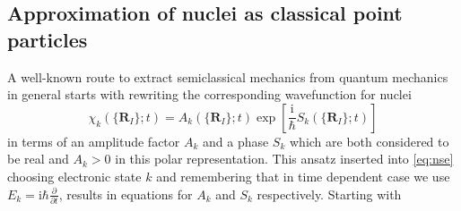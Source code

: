 \documentclass[12pt]{scrartcl}
\begin{document}
\subsection{Approximation of nuclei as classical point particles}
A well-known route to extract semiclassical mechanics from quantum mechanics in general starts with rewriting the corresponding wavefunction for nuclei
\begin{equation}
\chi_{k}(\{ \mathbf{R}_I\};t)=A_k(\{ \mathbf{R}_I\};t)\exp\left[ \frac{\mathrm{i}}{\hbar}S_k(\{ \mathbf{R}_I\};t) \right]
\label{ansatz:pointparticle}
\end{equation}
in terms of an amplitude factor $A_k$ and a phase $S_k$ which are both considered to be real and $A_k > 0$ in this polar representation. This ansatz inserted into \ref{eq:nse} choosing electronic state $k$ and remembering that in time dependent case we use $E_k=\mathrm{i}\hbar\frac{\partial}{\partial t}$, results in equations for $A_k$ and $S_k$ respectively. Starting with
\end{document}
